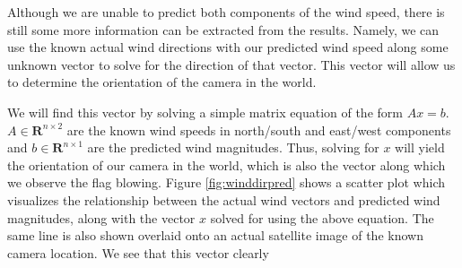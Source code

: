 Although we are unable to predict both components of the wind speed, there is still some more information can be extracted from the results. Namely, we can use the known actual wind directions with our predicted wind speed along some unknown vector to solve for the direction of that vector. This vector will allow us to determine the orientation of the camera in the world.

We will find this vector by solving a simple matrix equation of the form $Ax=b$. $A \in \mathbf{R}^{n\times 2}$ are the known wind speeds in north/south and east/west components and $b \in \mathbf{R}^{n \times 1}$ are the predicted wind magnitudes. Thus, solving for $x$ will yield the orientation of our camera in the world, which is also the vector along which we observe the flag blowing. Figure \ref{fig:winddirpred} shows a scatter plot which visualizes the relationship between the actual wind vectors and predicted wind magnitudes, along with the vector $x$ solved for using the above equation. The same line is also shown overlaid onto an actual satellite image of the known camera location. We see that this vector clearly 
